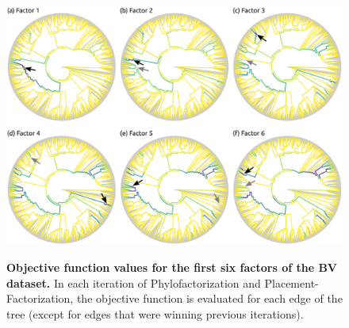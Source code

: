 \begin{figure}[!htbp]
    \centering
     \includegraphics[width=\linewidth]{pdf/pf_bv_place_no_tw_ovs.pdf}
    \begin{subfigure}{0pt}
        \label{fig:pf_bv_place_no_tw_ovs:sub:factor_1}
    \end{subfigure}
    \begin{subfigure}{0pt}
        \label{fig:pf_bv_place_no_tw_ovs:sub:factor_2}
    \end{subfigure}
    \begin{subfigure}{0pt}
        \label{fig:pf_bv_place_no_tw_ovs:sub:factor_3}
    \end{subfigure}
    \begin{subfigure}{0pt}
        \label{fig:pf_bv_place_no_tw_ovs:sub:factor_4}
    \end{subfigure}
    \begin{subfigure}{0pt}
        \label{fig:pf_bv_place_no_tw_ovs:sub:factor_5}
    \end{subfigure}
    \begin{subfigure}{0pt}
        \label{fig:pf_bv_place_no_tw_ovs:sub:factor_6}
    \end{subfigure}
    \caption[Objective function values for the first six factors of the \ac{BV} dataset]{
        \textbf{Objective function values for the first six factors of the \ac{BV} dataset.}
        In each iteration of Phylofactorization and Placement-Factorization, the objective function is evaluated
        for each edge of the tree (except for edges that were winning previous iterations).
}
\end{figure}

